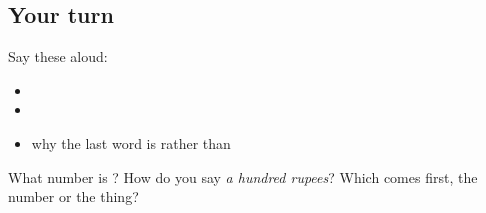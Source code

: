 \subsection*{Your turn}
Say these aloud:

\begin{itemize}
\raggedright
  \item {}
  \item {} 
  \item why the last word is  rather than 
\end{itemize}

\begin{tcolorbox}[breakable,colback=teal!4,colframe=teal!35!black,title={Before you move on}]
What number is \textbf{}? How do you say \emph{a hundred rupees}? Which comes first, the number or the thing?
\end{tcolorbox}
